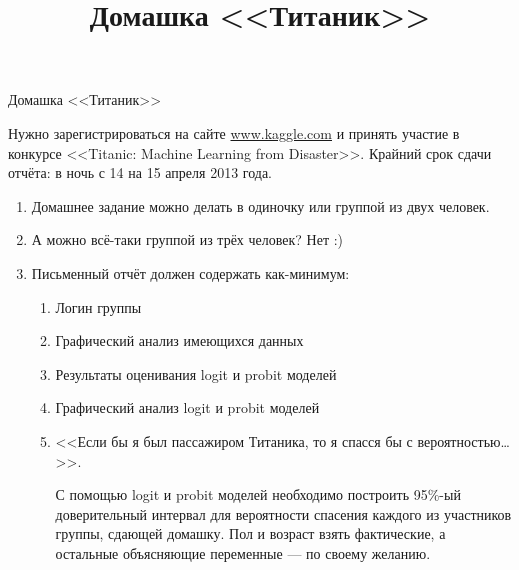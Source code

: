\documentclass[pdftex,12pt,a4paper]{article}
\title{Домашка <<Титаник>>}
\date{}
\begin{document}
\pagestyle{empty}
\begin{center}
Домашка <<Титаник>>
\end{center}

\vspace{15pt}

Нужно зарегистрироваться на сайте \url{www.kaggle.com} и принять участие в конкурсе <<Titanic: Machine Learning from Disaster>>. Крайний срок сдачи отчёта: в ночь с 14 на 15 апреля 2013 года.

\vspace{15pt}
\WhiteRoseLine
\vspace{15pt}

\begin{enumerate}
\item Домашнее задание можно делать в одиночку или группой из двух человек.
\item А можно всё-таки группой из трёх человек? Нет :)
\item Письменный отчёт  должен содержать как-минимум:
\begin{enumerate}
\item Логин группы
\item Графический анализ имеющихся данных
\item Результаты оценивания logit и probit моделей
\item Графический анализ logit и probit моделей
\item <<Если бы я был пассажиром Титаника, то я спасся бы с вероятностью\ldots>>. 

С помощью logit и probit моделей необходимо построить 95\%-ый доверительный интервал для вероятности спасения каждого из участников группы, сдающей домашку. Пол и возраст взять фактические, а остальные объясняющие переменные --- по своему желанию.
\end{enumerate}
\end{enumerate}


\vspace{15pt}
\RedRoseLine
\vspace{15pt}
\end{document}
